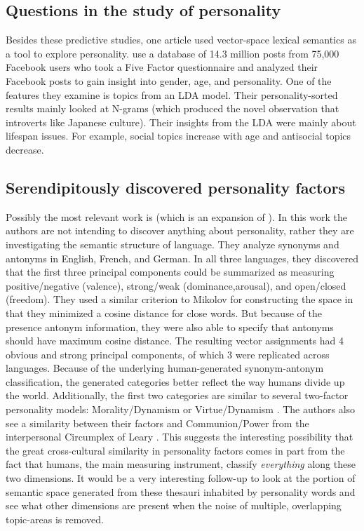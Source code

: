 \subsection{Questions in the study of personality}

Besides these predictive studies, one article used vector-space lexical 
semantics as a tool to explore personality. \citep{Schwartz2013a} use a database 
of 14.3 million posts from 75,000 Facebook users who took a Five Factor 
questionnaire and analyzed their Facebook posts to gain insight into gender, 
age, and personality. One of the features they examine is topics from an LDA 
model. Their personality-sorted results mainly looked at N-grams (which produced 
the novel observation that introverts like Japanese culture). Their insights 
from the LDA were mainly about lifespan issues. For example, social topics 
increase with age and antisocial topics decrease.

\subsection{Serendipitously discovered personality factors}

Possibly the most relevant work is \citep{Samsonovich2010} (which is an 
expansion of \citep{Samsonovich2007}). In this work the authors are not 
intending to discover anything about personality, rather they are investigating 
the semantic structure of language. They analyze synonyms and antonyms in 
English, French, and German. In all three languages, they discovered that the 
first three principal components could be summarized as measuring 
positive/negative (valence), strong/weak (dominance,arousal), and open/closed 
(freedom). They used a similar criterion to Mikolov for constructing the space 
in that they minimized a cosine distance for close words. But because of the 
presence antonym information, they were also able to specify that antonyms 
should have maximum cosine distance. The resulting vector assignments had 4 
obvious and strong principal components, of which 3 were replicated across 
languages. Because of the underlying human-generated synonym-antonym 
classification, the generated categories better reflect the way humans divide up 
the world. Additionally, the first two categories are similar to several 
two-factor personality models: Morality/Dynamism \citep{Saucier2005} or 
Virtue/Dynamism \citep{DeRaad2008}. The authors also see a similarity between 
their factors and Communion/Power from the interpersonal Circumplex of Leary 
\citep{Leary1957}. This suggests the interesting possibility that the great 
cross-cultural similarity in personality factors comes in part from the fact 
that humans, the main measuring instrument, classify \textit{everything} along 
these two dimensions. It would be a very interesting follow-up to look at the 
portion of semantic space generated from these thesauri inhabited by personality 
words and see what other dimensions are present when the noise of multiple, 
overlapping topic-areas is removed.
